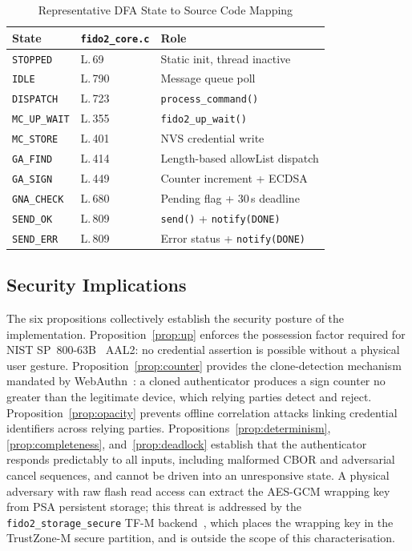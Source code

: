 \begin{table}[t]
\renewcommand{\arraystretch}{1.2}
\caption{Representative DFA State to Source Code Mapping}
\label{tab:impl-map}
\centering
\small
\begin{tabular}{@{}lll@{}}
\toprule
State & \texttt{fido2\_core.c} & Role \\
\midrule
\texttt{STOPPED}      & L.\,69  & Static init, thread inactive \\
\texttt{IDLE}         & L.\,790 & Message queue poll \\
\texttt{DISPATCH}     & L.\,723 & \texttt{process\_command()} \\
\texttt{MC\_UP\_WAIT} & L.\,355 & \texttt{fido2\_up\_wait()} \\
\texttt{MC\_STORE}    & L.\,401 & NVS credential write \\
\texttt{GA\_FIND}     & L.\,414 & Length-based allowList dispatch \\
\texttt{GA\_SIGN}     & L.\,449 & Counter increment + ECDSA \\
\texttt{GNA\_CHECK}   & L.\,680 & Pending flag + 30\,s deadline \\
\texttt{SEND\_OK}     & L.\,809 & \texttt{send()} + \texttt{notify(DONE)} \\
\texttt{SEND\_ERR}    & L.\,809 & Error status + \texttt{notify(DONE)} \\
\bottomrule
\end{tabular}
\end{table}

\subsection{Security Implications}
\label{sec:formal:security}

The six propositions collectively establish the security
posture of the implementation.
Proposition~\ref{prop:up} enforces the possession factor
required for NIST SP~800-63B~\cite{nist-800-63b} AAL2: no
credential assertion is possible without a physical user
gesture.
Proposition~\ref{prop:counter} provides the clone-detection
mechanism mandated by WebAuthn~\cite{webauthn-l3}: a cloned
authenticator produces a sign counter no greater than the
legitimate device, which relying parties detect and reject.
Proposition~\ref{prop:opacity} prevents offline correlation
attacks linking credential identifiers across relying
parties.
Propositions~\ref{prop:determinism},
\ref{prop:completeness}, and~\ref{prop:deadlock} establish
that the authenticator responds predictably to all inputs,
including malformed CBOR and adversarial cancel sequences,
and cannot be driven into an unresponsive state.
A physical adversary with raw flash read access can extract
the AES-GCM wrapping key from PSA persistent storage; this
threat is addressed by the \texttt{fido2\_storage\_secure}
TF-M backend~\cite{tf-m}, which places the wrapping key in
the TrustZone-M secure partition, and is outside the scope
of this characterisation.
